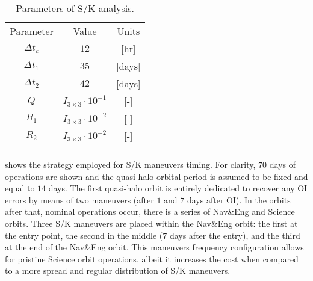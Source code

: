 %
%
\begin{table}[b!]
	\caption{Parameters of S/K analysis.}
	\label{tab:SKParameters}
	\centering
	\begin{tabular}{ccc}
		\TOPlines
		Parameter & Value & Units \\
		\MIDline
		$\Delta t_c$ & $12$ & [hr] \\
		$\Delta t_1$ & $35$ & [days] \\
		$\Delta t_2$ & $42$ & [days] \\				$Q$ & $I_{3\times3}\cdot10^{-1}$ & [-] \\
		$R_1$ & $I_{3\times3}\cdot10^{-2}$ & [-] \\
		$R_2$ & $I_{3\times3}\cdot10^{-2}$ & [-] \\
		\BOTTOMlines
	\end{tabular}
\end{table}
%

 shows the strategy employed for S/K maneuvers timing. For clarity, $70$ days of operations are shown and the quasi-halo orbital period is assumed to be fixed and equal to $14$ days. The first quasi-halo orbit is entirely dedicated to recover any {OI} errors by means of two maneuvers (after $1$ and $7$ days after OI). In the orbits after that, nominal operations occur, \ie there is a series of Nav\&Eng and Science orbits. Three S/K maneuvers are placed within the Nav\&Eng orbit: the first at the entry point, the second in the middle (\ie $7$ days after the entry), and the third at the end of the Nav\&Eng orbit. This maneuvers frequency configuration allows for pristine Science orbit operations, albeit it increases the cost when compared to a more spread and regular distribution of S/K maneuvers.

